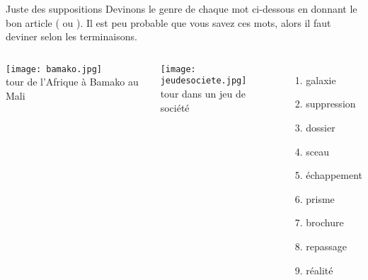 \begin{frame}{Juste des suppositions}
  Devinons le genre de chaque mot ci-dessous en donnant le bon article ( ou ).
  Il est peu probable que vous savez ces mots, alors il faut deviner selon les terminaisons.
  \begin{columns}[b]
      \begin{center}
        \texttt{[image: bamako.jpg]} \\
        \underline{} \alert{tour} de l'Afrique à Bamako au Mali
      \end{center}
      \begin{center}
        \texttt{[image: jeudesociete.jpg]} \\
        \underline{} \alert{tour} dans un jeu de société
      \end{center}
      \begin{enumerate}
        \item \underline{\uncover<3->{la}} galaxie
        \item \underline{} suppression
        \item \underline{\uncover<5->{le}} dossier
        \item \underline{} sceau
        \item \underline{} échappement 
        \item \underline{} prisme
        \item \underline{} brochure
        \item \underline{} repassage
        \item \underline{} réalité
      \end{enumerate}
  \end{columns}
\end{frame}